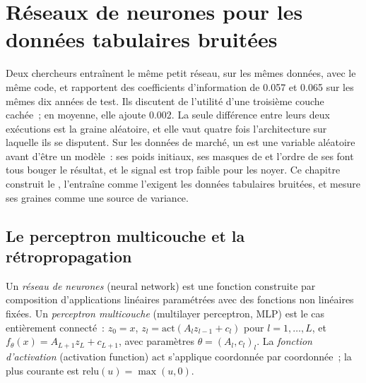 \chapter{Réseaux de neurones pour les données tabulaires bruitées}\label{ch:ml:neural-networks-for-noisy-tabular-data}

Deux chercheurs entraînent le même petit réseau, sur les mêmes données, avec le même code, et rapportent des coefficients
d'information de 0.057 et 0.065 sur les mêmes dix années de test. Ils discutent de l'utilité d'une troisième couche cachée~; en moyenne, elle ajoute
0.002. La seule différence entre leurs deux exécutions est la graine aléatoire, et elle vaut quatre fois l'architecture
sur laquelle ils se disputent. Sur les données de marché, un  est une variable aléatoire avant d'être un modèle~: ses poids initiaux,
ses masques de  et l'ordre de ses  font tous bouger le résultat, et le signal est trop faible pour les noyer.
Ce chapitre construit le , l'entraîne comme l'exigent les données tabulaires bruitées, et mesure ses graines comme une
source de variance.

\section{Le perceptron multicouche et la rétropropagation}

\begin{definition}\label{def:ml:neural-networks-for-noisy-tabular-data:mlp}
Un \emph{réseau de neurones} (neural network) est une fonction construite par composition d'applications linéaires paramétrées avec
des fonctions non linéaires fixées. Un \emph{perceptron multicouche} (multilayer perceptron, MLP) est le cas entièrement connecté~:
$z_0 = x$, $z_l = \mathrm{act}(A_lz_{l-1} + c_l)$ pour $l = 1,\dots,L$, et $f_\theta(x) = A_{L+1}z_L + c_{L+1}$, avec
paramètres $\theta = (A_l, c_l)_l$. La \emph{fonction d'activation} (activation function) $\mathrm{act}$ s'applique
coordonnée par coordonnée~; la plus courante est $\mathrm{relu}(u) = \max(u, 0)$.
\end{definition}

